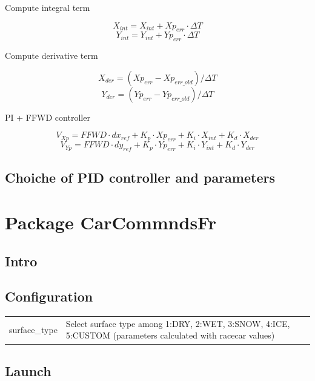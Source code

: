 \documentclass[12pt, letterpaper]{report}
\begin{document}

Compute integral term

\[
X_{int} = X_{int} + Xp_{err} \cdot \Delta T
\]
\[
Y_{int} = Y_{int} + Yp_{err} \cdot \Delta T
\]


Compute derivative term

\[
X_{der} = (Xp_{err} - Xp_{err\_old}) / \Delta T
\]
\[
Y_{der} = (Yp_{err} - Yp_{err\_old}) / \Delta T
\]


PI + FFWD controller 

\[
V_{Xp} = FFWD \cdot dx_{ref} + K_p \cdot Xp_{err} + K_i \cdot X_{int} + K_d \cdot X_{der}
\]
\[
V_{Yp} = FFWD \cdot dy_{ref} + K_p \cdot Yp_{err} + K_i \cdot Y_{int} + K_d \cdot Y_{der}
\]

\subsection{Choiche of PID controller and parameters}

\section{Package CarCommndsFr}

\subsection{Intro}

\subsection{Configuration}

\begin{center}
	\begin{tabularx}{\textwidth}{
			| >{\raggedright\arraybackslash}X
			| >{\arraybackslash}X |
		}
		\hline
		\multicolumn{2}{|c|}{\textbf{Surface Parameters}} \\
		\hline
		surface\_type & Select surface type among 1:DRY, 2:WET, 3:SNOW, 4:ICE, 5:CUSTOM (parameters calculated with racecar values) \\
		\hline
	\end{tabularx}
\end{center}

\subsection{Launch}
\end{document}
